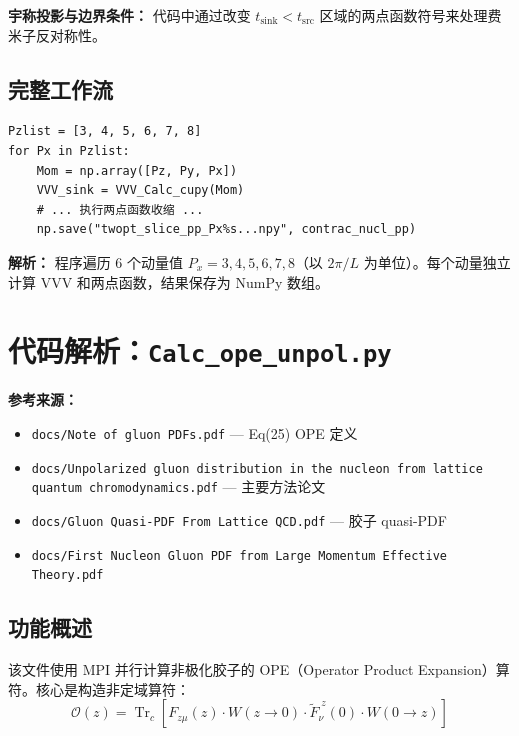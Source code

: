 \documentclass[12pt,a4paper]{ctexart}
\begin{document}
\textbf{宇称投影与边界条件：} 代码中通过改变 $t_{\text{sink}} < t_{\text{src}}$ 区域的两点函数符号来处理费米子反对称性。

\subsection{完整工作流}

\begin{lstlisting}[caption={主循环：遍历动量}]
Pzlist = [3, 4, 5, 6, 7, 8]
for Px in Pzlist:
    Mom = np.array([Pz, Py, Px])
    VVV_sink = VVV_Calc_cupy(Mom)
    # ... 执行两点函数收缩 ...
    np.save("twopt_slice_pp_Px%s...npy", contrac_nucl_pp)
\end{lstlisting}

\textbf{解析：}
程序遍历 6 个动量值 $P_x = 3,4,5,6,7,8$（以 $2\pi/L$ 为单位）。每个动量独立计算 VVV 和两点函数，结果保存为 NumPy 数组。

\section{代码解析：\texttt{Calc\_ope\_unpol.py}}
\label{sec:ope}

\textbf{参考来源：}
\begin{itemize}
    \item \texttt{docs/Note of gluon PDFs.pdf} — Eq(25) OPE 定义
    \item \texttt{docs/Unpolarized gluon distribution in the nucleon from lattice quantum chromodynamics.pdf} — 主要方法论文
    \item \texttt{docs/Gluon Quasi-PDF From Lattice QCD.pdf} — 胶子 quasi-PDF
    \item \texttt{docs/First Nucleon Gluon PDF from Large Momentum Effective Theory.pdf}
\end{itemize}

\subsection{功能概述}

该文件使用 MPI 并行计算非极化胶子的 OPE（Operator Product Expansion）算符。核心是构造非定域算符：
\begin{equation}
\mathcal{O}(z) = \operatorname{Tr}_c\left[ F_{z\mu}(z) \cdot W(z \to 0) \cdot \tilde{F}_{\nu}^{\;z}(0) \cdot W(0 \to z) \right]
\end{equation}
\end{document}

